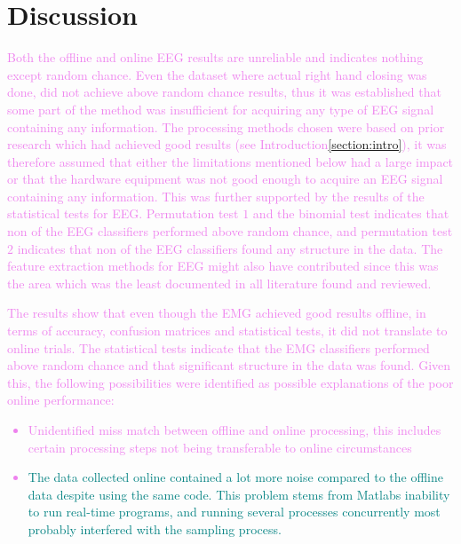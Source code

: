 \section{Discussion}
\label{section:discussion}

\textcolor{violet}{Both the offline and online EEG results are unreliable and indicates nothing except random chance. Even the dataset where actual right hand closing was done, did not achieve above random chance results, thus it was established that some part of the method was insufficient for acquiring any type of EEG signal containing any information. The processing methods chosen were based on prior research which had achieved good results (see Introduction\:\ref{section:intro}), it was therefore assumed that either the limitations mentioned below had a large impact or that the hardware equipment was not good enough to acquire an EEG signal containing any information. This was further supported by the results of the statistical tests for EEG. Permutation test $1$ and the binomial test indicates that non of the EEG classifiers performed above random chance, and permutation test $2$ indicates that non of the EEG classifiers found any structure in the data. The feature extraction methods for EEG might also have contributed since this was the area which was the least documented in all literature found and reviewed.}

\textcolor{violet}{The results show that even though the EMG achieved good results offline, in terms of accuracy, confusion matrices and statistical tests, it did not translate to online trials. The statistical tests indicate that the EMG classifiers performed above random chance and that significant structure in the data was found. Given this, the following possibilities were identified as possible explanations of the poor online performance:
\begin{itemize}
    \item Unidentified miss match between offline and online processing, this includes certain processing steps not being transferable to online circumstances
    \item \textcolor{teal}{The data collected online contained a lot more noise compared to the offline data despite using the same code. This problem stems from Matlabs inability to run real-time programs, and running several processes concurrently most probably interfered with the sampling process.}
\end{itemize}
}

